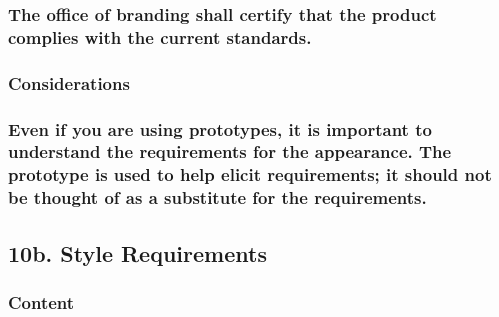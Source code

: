 \documentclass[
]{article}
\begin{document}
\hypertarget{the-office-of-branding-shall-certify-that-the-product-complies-with-the-current-standards.}{%
\subsubsection{\texorpdfstring{The office of branding shall certify that
the product complies with the current standards.
}{The office of branding shall certify that the product complies with the current standards. }}\label{the-office-of-branding-shall-certify-that-the-product-complies-with-the-current-standards.}}

\hypertarget{considerations-18}{%
\subsubsection{Considerations}\label{considerations-18}}

\hypertarget{even-if-you-are-using-prototypes-it-is-important-to-understand-the-requirements-for-the-appearance.-the-prototype-is-used-to-help-elicit-requirements-it-should-not-be-thought-of-as-a-substitute-for-the-requirements.}{%
\subsubsection{\texorpdfstring{Even if you are using prototypes, it is
important to understand the requirements for the appearance. The
prototype is used to help elicit requirements; it should not be thought
of as a substitute for the requirements.
}{Even if you are using prototypes, it is important to understand the requirements for the appearance. The prototype is used to help elicit requirements; it should not be thought of as a substitute for the requirements. }}\label{even-if-you-are-using-prototypes-it-is-important-to-understand-the-requirements-for-the-appearance.-the-prototype-is-used-to-help-elicit-requirements-it-should-not-be-thought-of-as-a-substitute-for-the-requirements.}}

\hypertarget{b.-style-requirements}{%
\subsection{\texorpdfstring{10b. Style Requirements
}{10b. Style Requirements }}\label{b.-style-requirements}}

\hypertarget{content-31}{%
\subsubsection{Content}\label{content-31}}
\end{document}
